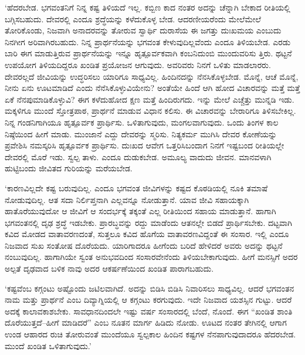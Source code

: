 ‘ಹೆದರಬೇಡ. ಭಗವಂತನಿಗೆ ನಿನ್ನ ಕಷ್ಟ ತಿಳಿಯದೆ ಇಲ್ಲ. ಕಬ್ಬಿಣ ಕಾದ ನಂತರ ಅದನ್ನು ಚೆನ್ನಾಗಿ ಬೇಕಾದ ರೀತಿಯಲ್ಲಿ ಬಗ್ಗಿಸಬಹುದು. ದೇವರಲ್ಲಿ ಎಂದೂ ಶ್ರದ್ಧೆಯನ್ನು ಕಳೆದುಕೊಳ್ಳ ಬೇಡ. ಆದರಣೀಯರೆಂದು ಮೇಲೆಮೇಲೆ ತೋರಿಕೊಂಡು, ನಿಜವಾಗಿ ಅನಾದರವನ್ನು ತೋರುವ ಸ್ವಾರ್ಥಿ ದುರಾಸೆಯ ಈ ಜಗತ್ತು ದುಃಖಮಯ ಎಂಬುದು ನಿನಗೀಗ ಅರಿವಾಗಿರಬಹುದು. ನಿನ್ನ ಪ್ರಾರ್ಥನೆಯನ್ನು ಭಗವಂತ ಕೇಳುವುದಿಲ್ಲವೆಂದು ಎಂದೂ ತಿಳಿಯಬೇಡ. ಎರಡು ಬಾರಿ ಈಗ ಮಾಡುತ್ತಿರುವ ಪ್ರಾರ್ಥನೆಯನ್ನು ಇನ್ನೂ ಹೃತ್ಪೂರ್ವಕವಾಗಿ ಕಂಬನಿದುಂಬಿ ಮುಂದುವರಿಸು ತ್ತಿರು. ಥಟ್ಟನೆ ಉಪಯೋಗ ತಿಳಿಯದಿದ್ದರೂ ಖಂಡಿತ ಪ್ರಯೋಜನ ಆಗುವುದು. ಅವರಿವರು ನಿನಗೆ ಒಳಿತು ಮಾಡಲಾರರು. ದೇವರಲ್ಲದೆ ಜೀವಿಯನ್ನು ಉದ್ಧರಿಸಲು ಯಾರಿಗೂ ಸಾಧ್ಯವಿಲ್ಲ. ಹಿಂದಿನದನ್ನು ನೆನಸಿಕೊಳ್ಳಬೇಡ. ಮೊನ್ನೆ, ಆಚೆ ಮೊನ್ನೆ, ನೀನು ಏನು ಊಟಮಾಡಿದೆ ಎಂದು ನೆನೆಸಿಕೊಳ್ಳುವಿಯೇನು? ಅಂತೆಯೇ ಹಿಂದೆ ಆಗಿ ಹೋದ ವಿಚಾರವನ್ನು ಮತ್ತೆ ಮತ್ತೆ ಏಕೆ ನೆನಪುಮಾಡಿಕೊಳ್ಳುವಿ? ಈಗ ಕಳೆದುಹೋದ ಕ್ಷಣ ಮತ್ತೆ ಹಿಂದಿರುಗದು. ಇನ್ನು ಮೇಲೆ ಎಚ್ಚೆತ್ತು ಮುನ್ನಡಿ ಇಡು. ಮಕ್ಕಳಿಗೂ ಮುಂದೆ ಸ್ತೋತ್ರಪಾಠ, ಪ್ರಾರ್ಥನೆ ಮಾಡುವ ವಿಧಾನ ಕಲಿಸು. ಈ ವಿಚಾರವನ್ನು ಬೇರಾರಿಗೂ ತಿಳಿಸಬೇಕಿಲ್ಲ. ನಿನ್ನ ಗಂಡನಿಗಾಗಿಯೂ ಹೃತ್ಪೂರ್ವಕ ಪ್ರಾರ್ಥಿಸು. ಒಳಿತಾಗುವುದು, ಮಂಗಲವಾಗುವುದು. ಒಂದು ತಿಂಗಳ ಕಾಲ ನಿಷ್ಠೆಯಿಂದ ಹೀಗೆ ಮಾಡು. ಮುಂಜಾನೆ ಎದ್ದು ದೇವರನ್ನು ಸ್ಮರಿಸು. ನಿತ್ಯಕರ್ಮ ಮುಗಿಸಿ ದೇವರ ಕೋಣೆಯನ್ನು ಪ್ರವೇಶಿಸಿ ನಮಸ್ಕರಿಸಿ ಹೃತ್ಪೂರ್ವಕ ಪ್ರಾರ್ಥಿಸು. ದುಃಖದ ಆವೇಗ ಒತ್ತರಿಸಿಬಂದಾಗ ನಿನಗೆ ಇಷ್ಟಬಂದ ರೀತಿಯಲ್ಲೇ ದೇವರಲ್ಲಿ ಮೊರೆ ಇಡು. ಸ್ವಲ್ಪ ತಾಳು. ಎಂದೂ ದುಡುಕಬೇಡ. ಅಮೂಲ್ಯ ವಾದುದು ಜೀವನ. ಮಾನವಳಾಗಿ ಹುಟ್ಟಿಬಂದು ಜೀವಿತದ ಗುರಿಯನ್ನು ಮರೆಯಬೇಡ.

\vskip 2pt

‘ಕಾರಣವಿಲ್ಲದೇ ಕಷ್ಟ ಬರುವುದಿಲ್ಲ. ಎಂದೂ ಭಗವಂತ ಜೀವಿಗಳನ್ನು ಕಷ್ಟದ ಕೊಠಡಿಯಲ್ಲಿ ನೂಕಿ ತಮಾಷೆ ನೋಡುವುದಿಲ್ಲ. ಆತ ಸದಾ ನಿರ್ಲಿಪ್ತನಾಗಿ ಎಲ್ಲವನ್ನೂ ನೋಡುತ್ತಾನೆ. ಯಾವ ಜೀವಿ ಸಹಾಯಕ್ಕಾಗಿ ಹಾತೊರೆಯುವುದೋ ಆ ಜೀವಿಗೆ ಆ ಸಂದರ್ಭಕ್ಕೆ ತಕ್ಕಂತೆ ಎಲ್ಲ ರೀತಿಯಿಂದ ಸಹಾಯ ಮಾಡುತ್ತಾನೆ. ಹಾಗಾಗಿ ಭಗವಂತನಲ್ಲಿ ದೃಢ ಶ್ರದ್ಧೆ ಇಡಬೇಕು. ಪ್ರಾರಬ್ಧವನ್ನು ರದ್ದು ಮಾಡೆಂದು ಆತನಲ್ಲೇ ಬಿಡದೆ ಪ್ರಾರ್ಥಿಸಬೇಕು. ದಟ್ಟವಾಗಿ ಕವಿದ ಮೋಡದ ವಾತಾವರಣದಂತೆ, ಸುತ್ತಲೂ ಕವಿದ ಹೊಗೆಯ ವಾತಾವರಣವಿದ್ದಂತೆ ಈ ಸಂಸಾರ. ಇಲ್ಲಿ ಎಂದೂ ನಿಜವಾದ ಸುಖ ಸಂತೋಷ ದೊರೆಯದು. ಯಾರಿಗಾದರೂ ಹೀಗೆಂದು ಬರಿದೆ ಹೇಳಿದರೆ ಅವರು ಅದನ್ನು ಥಟ್ಟನೆ ನಂಬುವುದಿಲ್ಲ. ಹಾಗಾಗಿಯೇ ಸ್ವಂತ ಅನುಭವದಿಂದ ಸಂಸಾರವೇನೆಂದು ತಿಳಿಯಬೇಕಾಗುವುದು. ಹೀಗೆ ಮನಸ್ಸಿಗೆ ಅದರ ಅಲ್ಪತೆ ದೃಢವಾದ ಬಳಿಕ ನಾವು ಅದರ ಆಕರ್ಷಣೆಯಿಂದ ಖಂಡಿತ ಪಾರಾಗಬಹುದು.

\vskip 2pt

‘ಕಷ್ಟವೆಂಬ ಕಗ್ಗಂಟು ಅಷ್ಟೊಂದು ಜಟಿಲವಾಗಿದೆ. ಅದನ್ನು ಬಿಡಿಸಿ ಬಿಡಿಸಿ ನಿವಾರಿಸಲು ಸಾಧ್ಯವಿಲ್ಲ. ಆದರೆ ಭಗವಂತನ ನಾಮ ಮತ್ತು ಪ್ರಾರ್ಥನೆ ಎಂಬ ದಿವ್ಯಾಗ್ನಿಯಲ್ಲಿ ಆ ಕಗ್ಗಂಟು ಕರಗುವುದು. ಇದೇ ನಿಜವಾದ ಯಶಸ್ಸಿನ ಗುಟ್ಟು. ಆದರೆ ಅದಕ್ಕೆ ಕಾಲಾವಕಾಶಬೇಕು. ಸಾವಧಾನದಿಂದಲೇ ಇಷ್ಟು ವರ್ಷ ಸಂಸಾರದಲ್ಲಿ ಬೆಂದೆ, ನೊಂದೆ. ಈಗ “ಖಂಡಿತ ಶಾಂತಿ ದೊರೆಯುತ್ತದೆ–ಹೀಗೆ ಮಾಡಿದರೆ” ಎಂಬ ನೂತನ ಮಾರ್ಗ ಹಿಡಿದು ನೋಡು. ಊಟದ ನಂತರ ತೇಗಿನಲ್ಲಿ ಆಗಾಗ ಉಂಡ ಆಹಾರದ ರುಚಿ ತೋರುವಂತೆ ಮುಂದೆಯೂ ಸ್ವಲ್ಪಕಾಲ ಹಿಂದಿನ ಕಷ್ಟಗಳ ನೆನಪಾಗುವುದಾದರೂ ಹೆದರಬೇಡ. ಮುಂದೆ ಖಂಡಿತ ಒಳಿತಾಗುವುದು.’

\vskip 2pt

